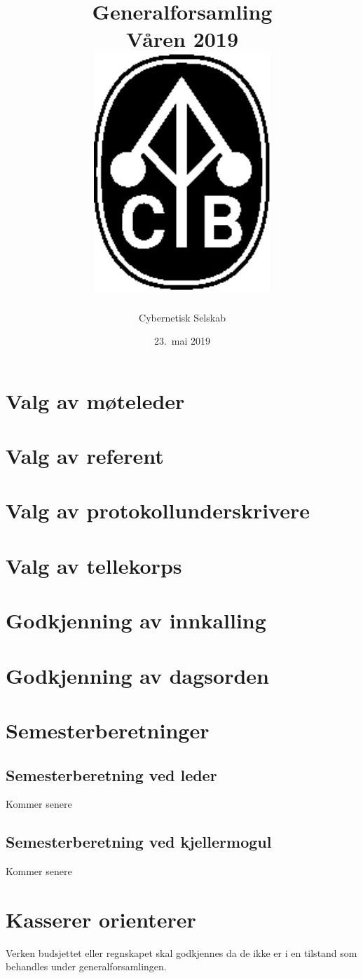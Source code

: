\documentclass[10pt,norsk,a4paper]{article}
\title{Generalforsamling \\
	Våren 2019\\[3cm]
	\includegraphics[width=0.5\textwidth]{cyb-logo.eps}\\[-.5cm]}
\date{23.\ mai 2019}
\author{Cybernetisk Selskab}
\begin{document}
\maketitle{}
\newpage
\tableofcontents

\section{Valg av møteleder}

\section{Valg av referent}

\section{Valg av protokollunderskrivere}

\section{Valg av tellekorps}

\section{Godkjenning av innkalling}

\section{Godkjenning av dagsorden}

\newpage

\section{Semesterberetninger}
\subsection{Semesterberetning ved leder}

Kommer senere

\subsection{Semesterberetning ved kjellermogul}

Kommer senere


\newpage

\section{Kasserer orienterer}
Verken budsjettet eller regnskapet skal godkjennes da
de ikke er i en tilstand som behandles under generalforsamlingen.
\end{document}
